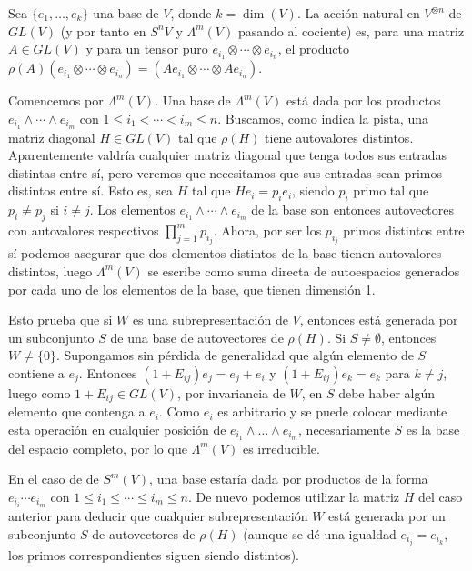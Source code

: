 \documentclass[twoside]{article}
\begin{document}
\begin{solucion}
Sea $\{e_1,\dots, e_k\}$ una base de $V$, donde $k=\dim(V)$. La acción natural en $V^{\otimes n}$ de $GL(V)$ (y por tanto en $S^n V$ y $\Lambda^m(V)$ pasando al cociente) es, para una matriz $A\in GL(V)$ y para un tensor puro $e_{i_1}\otimes\cdots\otimes e_{i_n}$, el producto $\rho(A)(e_{i_1}\otimes\cdots\otimes e_{i_n})=(Ae_{i_1}\otimes\cdots\otimes Ae_{i_n})$. 

Comencemos por $\Lambda^m(V)$. Una base de $\Lambda^m(V)$ está dada por los productos $e_{i_1}\land\cdots\land e_{i_m}$ con $1\leq i_1<\cdots< i_m\leq n$. Buscamos, como indica la pista, una matriz diagonal $H\in GL(V)$ tal que $\rho(H)$ tiene autovalores distintos. Aparentemente valdría cualquier matriz diagonal que tenga todos sus entradas distintas entre sí, pero veremos que necesitamos que sus entradas sean primos distintos entre sí. Esto es, sea $H$ tal que $He_i=p_ie_i$, siendo $p_i$ primo tal que $p_i\neq p_j$ si $i\neq j$. Los elementos $e_{i_1}\land\cdots\land e_{i_m}$ de la base son entonces autovectores con autovalores respectivos $\prod_{j=1}^m p_{i_j}$. Ahora, por ser los $p_{i_j}$ primos distintos entre sí podemos asegurar que dos elementos distintos de la base tienen autovalores distintos, luego $\Lambda^m(V)$ se escribe como suma directa de autoespacios generados por cada uno de los elementos de la base, que tienen dimensión 1. 

Esto prueba que si $W$ es una subrepresentación de $V$, entonces está generada por un subconjunto $S$ de una base de autovectores de $\rho(H)$. Si $S\neq\emptyset$, entonces $W\neq \{0\}$. Supongamos sin pérdida de generalidad que algún elemento de $S$ contiene a $e_j$. Entonces $(1+E_{ij})e_j=e_j+e_i$ y $(1+E_{ij})e_k=e_k$ para $k\neq j$, luego como $1+E_{ij}\in GL(V)$, por invariancia de $W$, en $S$ debe haber algún elemento que contenga a $e_i$. Como $e_i$ es arbitrario y se puede colocar mediante esta operación en cualquier posición de $e_{i_1}\land\dots\land e_{i_m}$, necesariamente $S$ es la base del espacio completo, por lo que $\Lambda^m(V)$ es irreducible. 

En el caso de de $S^m(V)$, una base estaría dada por productos de la forma $e_{i_i}\cdots e_{i_m}$ con $1\leq i_1\leq\cdots\leq i_m\leq n$. De nuevo podemos utilizar la matriz $H$ del caso anterior para deducir que cualquier subrepresentación $W$ está generada por un subconjunto $S$ de autovectores de $\rho(H)$ (aunque se dé una igualdad $e_{i_j}=e_{i_k}$, los primos correspondientes siguen siendo distintos).


\end{solucion}
\end{document}
